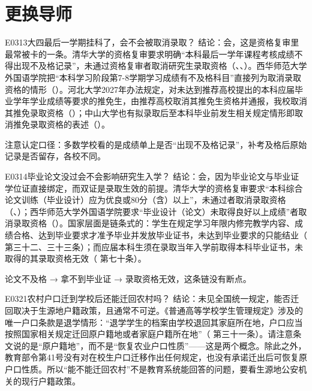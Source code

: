 \section{更换导师}
\begin{qa}{E0313}{大四最后一学期挂科了，会不会被取消录取？}
结论：会，这是资格复审里最常被卡的一条。清华大学的资格复审要求明确“本科最后一学年课程考核成绩不得出现不及格记录”，未通过资格复审者取消研究生录取资格（、、）。西华师范大学外国语学院把“本科学习阶段第7-8学期学习成绩有不及格科目”直接列为取消录取资格的情形（）。河北大学2027年办法规定，对未达到推荐高校提出的本科应届毕业学年学业成绩等要求的推免生，由推荐高校取消其推免生资格并通报，我校取消其推免录取资格（）；中山大学也有拟录取后至本科毕业前发生相关规定情形即取消推免录取资格的表述（）。

注意认定口径：多数学校看的是成绩单上是否“出现不及格记录”，补考及格后原始记录是否留存，各校不同。
\end{qa}

\begin{qa}{E0314}{毕业论文没过会不会影响研究生入学？}
结论：会，因为毕业论文与毕业证学位证直接绑定，而双证是录取生效的前提。清华大学的资格复审要求“本科综合论文训练（毕业设计）应为优良或80分（含）以上”，未通过者取消录取资格（、）；西华师范大学外国语学院要求“毕业设计（论文）未取得良好以上成绩”者取消录取资格（）。国家层面是链条式的：学生在规定学习年限内修完教学内容、成绩合格、达到毕业要求才准予毕业并发放毕业证书，未达到毕业要求的只能结业（ 第三十二、三十三条）；而应届本科生须在录取当年入学前取得本科毕业证书，未取得的其录取资格无效（ 第七十条）。

论文不及格 → 拿不到毕业证 → 录取资格无效，这条链没有断点。
\end{qa}

\begin{qa}{E0321}{农村户口迁到学校后还能迁回农村吗？}
结论：未见全国统一规定，能否迁回取决于生源地户籍政策，且通常不可逆。《普通高等学校学生管理规定》涉及的唯一户口条款是退学情形：“退学学生的档案由学校退回其家庭所在地，户口应当按照国家相关规定迁回原户籍地或者家庭户籍所在地”（ 第三十一条）。请注意条文说的是“原户籍地”，而不是“恢复农业户口性质”——这是两个概念。除此之外，教育部令第41号没有对在校生户口迁移作出任何规定，也没有承诺迁出后可恢复原户口性质。所以“能不能迁回农村”不是教育系统能回答的问题，要看生源地公安机关的现行户籍政策。
\end{qa}

